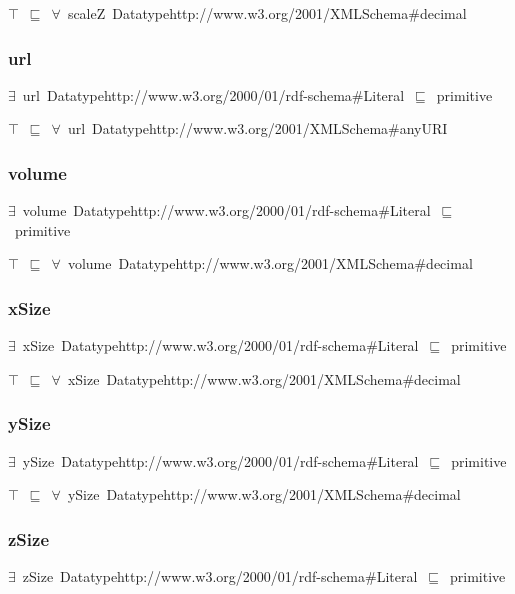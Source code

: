 \documentclass{article}
\begin{document}
\ensuremath{\top}~\ensuremath{\sqsubseteq}~\ensuremath{\forall}~scaleZ~Datatypehttp://www.w3.org/2001/XMLSchema#decimal

\subsubsection*{url}

\ensuremath{\exists}~url~Datatypehttp://www.w3.org/2000/01/rdf-schema#Literal~\ensuremath{\sqsubseteq}~primitive

\ensuremath{\top}~\ensuremath{\sqsubseteq}~\ensuremath{\forall}~url~Datatypehttp://www.w3.org/2001/XMLSchema#anyURI

\subsubsection*{volume}

\ensuremath{\exists}~volume~Datatypehttp://www.w3.org/2000/01/rdf-schema#Literal~\ensuremath{\sqsubseteq}~primitive

\ensuremath{\top}~\ensuremath{\sqsubseteq}~\ensuremath{\forall}~volume~Datatypehttp://www.w3.org/2001/XMLSchema#decimal

\subsubsection*{xSize}

\ensuremath{\exists}~xSize~Datatypehttp://www.w3.org/2000/01/rdf-schema#Literal~\ensuremath{\sqsubseteq}~primitive

\ensuremath{\top}~\ensuremath{\sqsubseteq}~\ensuremath{\forall}~xSize~Datatypehttp://www.w3.org/2001/XMLSchema#decimal

\subsubsection*{ySize}

\ensuremath{\exists}~ySize~Datatypehttp://www.w3.org/2000/01/rdf-schema#Literal~\ensuremath{\sqsubseteq}~primitive

\ensuremath{\top}~\ensuremath{\sqsubseteq}~\ensuremath{\forall}~ySize~Datatypehttp://www.w3.org/2001/XMLSchema#decimal

\subsubsection*{zSize}

\ensuremath{\exists}~zSize~Datatypehttp://www.w3.org/2000/01/rdf-schema#Literal~\ensuremath{\sqsubseteq}~primitive
\end{document}
